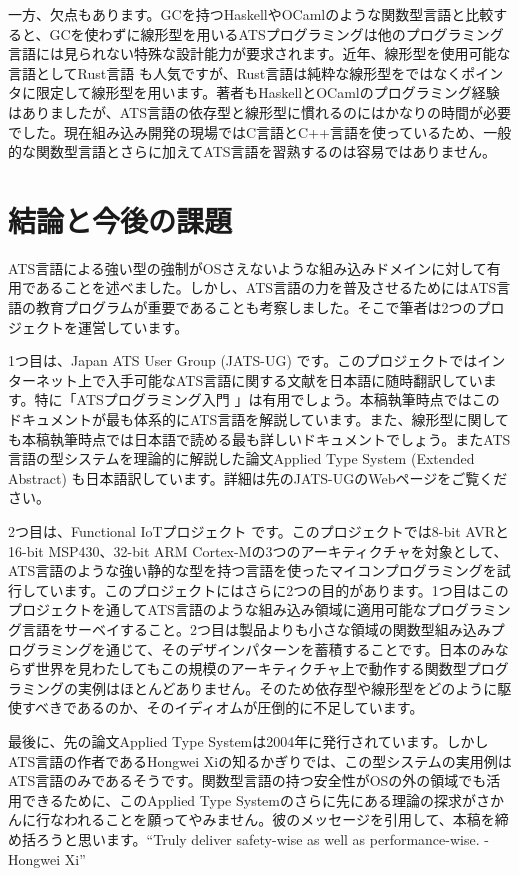 \documentclass{ipsjprosym}
\begin{document}
一方、欠点もあります。GCを持つHaskellやOCamlのような関数型言語と比較すると、GCを使わずに線形型を用いるATSプログラミングは他のプログラミング言語には見られない特殊な設計能力が要求されます。近年、線形型を使用可能な言語としてRust言語 \cite{rust} も人気ですが、Rust言語は純粋な線形型をではなくポインタに限定して線形型を用います。著者もHaskellとOCamlのプログラミング経験はありましたが、ATS言語の依存型と線形型に慣れるのにはかなりの時間が必要でした。現在組み込み開発の現場ではC言語とC++言語を使っているため、一般的な関数型言語とさらに加えてATS言語を習熟するのは容易ではありません。

\section{結論と今後の課題}

ATS言語による強い型の強制がOSさえないような組み込みドメインに対して有用であることを述べました。しかし、ATS言語の力を普及させるためにはATS言語の教育プログラムが重要であることも考察しました。そこで筆者は2つのプロジェクトを運営しています。

1つ目は、Japan ATS User Group (JATS-UG) \cite{jats-ug} です。このプロジェクトではインターネット上で入手可能なATS言語に関する文献を日本語に随時翻訳しています。特に「ATSプログラミング入門 \cite{INT2PROGINATS-J}」は有用でしょう。本稿執筆時点ではこのドキュメントが最も体系的にATS言語を解説しています。また、線形型に関しても本稿執筆時点では日本語で読める最も詳しいドキュメントでしょう。またATS言語の型システムを理論的に解説した論文Applied Type System (Extended Abstract) \cite{ATStypes03} も日本語訳しています。詳細は先のJATS-UGのWebページをご覧ください。

2つ目は、Functional IoTプロジェクト \cite{fpiot} です。このプロジェクトでは8-bit AVRと16-bit MSP430、32-bit ARM Cortex-Mの3つのアーキティクチャを対象として、ATS言語のような強い静的な型を持つ言語を使ったマイコンプログラミングを試行しています。このプロジェクトにはさらに2つの目的があります。1つ目はこのプロジェクトを通してATS言語のような組み込み領域に適用可能なプログラミング言語をサーベイすること。2つ目は製品よりも小さな領域の関数型組み込みプログラミングを通じて、そのデザインパターンを蓄積することです。日本のみならず世界を見わたしてもこの規模のアーキティクチャ上で動作する関数型プログラミングの実例はほとんどありません。そのため依存型や線形型をどのように駆使すべきであるのか、そのイディオムが圧倒的に不足しています。

最後に、先の論文Applied Type Systemは2004年に発行されています。しかしATS言語の作者であるHongwei Xiの知るかぎりでは、この型システムの実用例はATS言語のみであるそうです。関数型言語の持つ安全性がOSの外の領域でも活用できるために、このApplied Type Systemのさらに先にある理論の探求がさかんに行なわれることを願ってやみません。彼のメッセージを引用して、本稿を締め括ろうと思います。``Truly deliver safety-wise as well as performance-wise. - Hongwei Xi''
\end{document}
